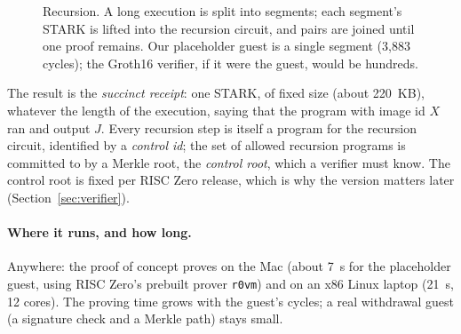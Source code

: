 \documentclass[11pt]{article}
\begin{document}
\begin{figure}[H]
\centering
{}
\caption{Recursion. A long execution is split into segments; each
segment's STARK is lifted into the recursion circuit, and pairs are
joined until one proof remains. Our placeholder guest is a single
segment (3,883 cycles); the Groth16 verifier, if it were the guest,
would be hundreds.}
\label{fig:recursion}
\end{figure}

The result is the \emph{succinct receipt}: one STARK, of fixed size
(about 220~KB), whatever the length of the execution, saying that the
program with image id $X$ ran and output $J$. Every recursion step is
itself a program for the recursion circuit, identified by a
\emph{control id}; the set of allowed recursion programs is committed to
by a Merkle root, the \emph{control root}, which a verifier must know.
The control root is fixed per RISC Zero release, which is why the
version matters later (Section~\ref{sec:verifier}).

\paragraph{Where it runs, and how long.} Anywhere: the proof of concept
proves on the Mac (about 7~s for the placeholder guest, using RISC
Zero's prebuilt prover \texttt{r0vm}) and on an x86 Linux laptop (21~s,
12 cores). The proving time grows with the guest's cycles; a real
withdrawal guest (a signature check and a Merkle path) stays small.
\end{document}
